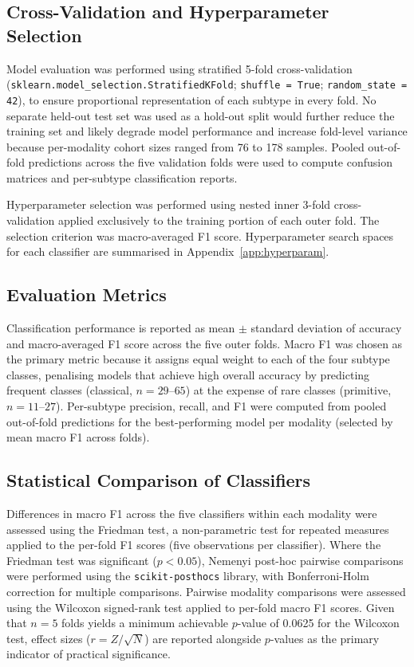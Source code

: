 \subsection{Cross-Validation and Hyperparameter Selection}
\label{subsec:cv_method}
 
Model evaluation was performed using stratified 5-fold cross-validation (\texttt{sklearn.model\_selection.StratifiedKFold}; \texttt{shuffle = True}; \texttt{random\_state = 42}), to ensure proportional representation of each subtype in every fold. No separate held-out test set was used as a hold-out split would further reduce the training set and likely degrade model performance and increase fold-level variance because per-modality cohort sizes ranged from 76 to 178 samples. Pooled out-of-fold predictions across the five validation folds were used to compute confusion matrices and per-subtype classification reports.
 
Hyperparameter selection was performed using nested inner 3-fold cross-validation applied exclusively to the training portion of each outer fold. The selection criterion was macro-averaged F1 score. Hyperparameter search spaces for each classifier are summarised in Appendix~\ref{app:hyperparam}. 


\subsection{Evaluation Metrics}
 
Classification performance is reported as mean $\pm$ standard deviation of accuracy and macro-averaged F1 score across the five outer folds. Macro F1 was chosen as the primary metric because it assigns equal weight to each of the four subtype classes, penalising models that achieve high overall accuracy by predicting frequent classes (classical, $n = 29$--$65$) at the expense of rare classes (primitive, $n = 11$--$27$). Per-subtype precision, recall, and F1 were computed from pooled out-of-fold predictions for the best-performing model per modality (selected by mean macro F1 across folds).


\subsection{Statistical Comparison of Classifiers}
 
Differences in macro F1 across the five classifiers within each modality were assessed using the Friedman test, a non-parametric test for repeated measures applied to the per-fold F1 scores (five observations per classifier). Where the Friedman test was significant ($p < 0.05$), Nemenyi post-hoc pairwise comparisons were performed using the \texttt{scikit-posthocs} library, with Bonferroni-Holm correction for multiple comparisons. Pairwise modality comparisons were
assessed using the Wilcoxon signed-rank test applied to per-fold macro F1 scores. Given that $n = 5$ folds yields a minimum achievable $p$-value of 0.0625 for the Wilcoxon test, effect sizes ($r = Z / \sqrt{N}$) are reported alongside $p$-values as the primary indicator of practical significance.



